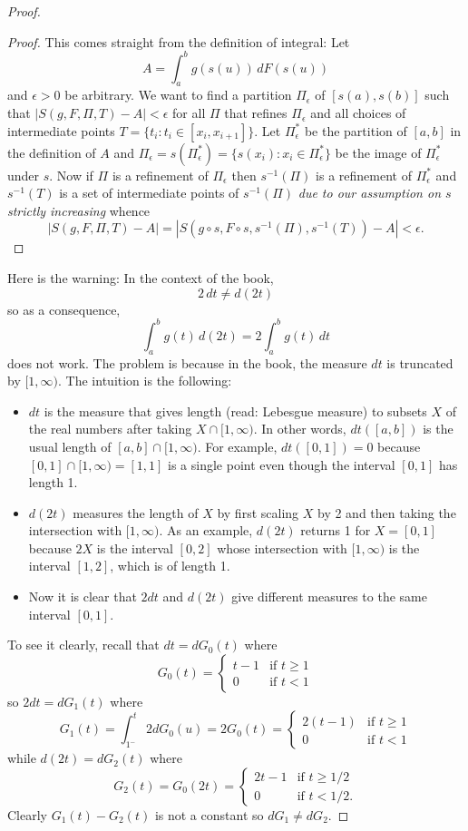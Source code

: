 \documentclass[12pt]{article}
\begin{document}
\begin{proof}
\begin{proof}
This comes straight from the definition of integral: Let
$$A = \int_{a}^{b} g(s(u)) \, dF(s(u))$$
and $\epsilon > 0$ be arbitrary. We want to find a partition $\Pi_\epsilon$ of $[s(a), s(b)]$ such that $|S(g, F, \Pi, T) - A| < \epsilon$ for all $\Pi$ that refines $\Pi_\epsilon$ and all choices of intermediate points $T = \{ t_i : t_i \in [x_i, x_{i+1}] \}$. Let $\Pi_\epsilon^*$ be the partition of $[a, b]$ in the definition of $A$ and $\Pi_\epsilon = s(\Pi_\epsilon^*) = \{s(x_i) : x_i \in \Pi_\epsilon^*\}$ be the image of $\Pi_\epsilon^*$ under $s$. Now if $\Pi$ is a refinement of $\Pi_\epsilon$ then $s^{-1}(\Pi)$ is a refinement of $\Pi_\epsilon^*$ and $s^{-1}(T)$ is a set of intermediate points of $s^{-1}(\Pi)$ \emph{due to our assumption on $s$ strictly increasing} whence
$$|S(g, F, \Pi, T) - A| = |S(g \circ s, F \circ s, s^{-1}(\Pi), s^{-1}(T)) - A| < \epsilon.$$
\end{proof}

Here is the warning: In the context of the book,
$$2 \, dt \not= d(2t)$$
so as a consequence,
$$\int_a^b g(t) \, d(2t) = 2 \int_a^b g(t) \, dt$$
does not work. The problem is because in the book, the measure $dt$ is truncated by $[1, \infty)$. The intuition is the following:
\begin{itemize}
\item $dt$ is the measure that gives length (read: Lebesgue measure) to subsets $X$ of the real numbers after taking $X \cap [1, \infty)$. In other words, $dt( [a, b] )$ is the usual length of $[a, b] \cap [1, \infty)$. For example, $dt( [0, 1] ) = 0$ because $[0, 1] \cap [1, \infty) = [1, 1]$ is a single point even though the interval $[0, 1]$ has length 1.

\item $d(2t)$ measures the length of $X$ by first scaling $X$ by 2 and then taking the intersection with $[1, \infty)$. As an example, $d(2t)$ returns 1 for $X = [0, 1]$ because $2X$ is the interval $[0, 2]$ whose intersection with $[1, \infty)$ is the interval $[1, 2]$, which is of length 1.

\item Now it is clear that $2dt$ and $d(2t)$ give different measures to the same interval $[0, 1]$.
\end{itemize}

To see it clearly, recall that $dt = d G_0(t)$ where
$$G_0(t) = \begin{cases} t - 1 &\text{if } t \geq 1\\ 0 &\text{if } t < 1 \end{cases}$$
so $2dt = d G_1(t)$ where
$$G_1(t) = \int_{1^-}^{t} 2 dG_0(u) = 2 G_0(t) = \begin{cases} 2(t - 1) &\text{if } t \geq 1\\ 0 &\text{if } t < 1 \end{cases}$$
while $d(2t) = dG_2(t)$ where
$$G_2(t) = G_0(2t) = \begin{cases} 2t - 1 &\text{if } t \geq 1/2\\ 0 &\text{if } t < 1/2 .\end{cases}$$
Clearly $G_1(t) - G_2(t)$ is not a constant so $d G_1 \not= d G_2$.


\end{proof}
\end{document}
